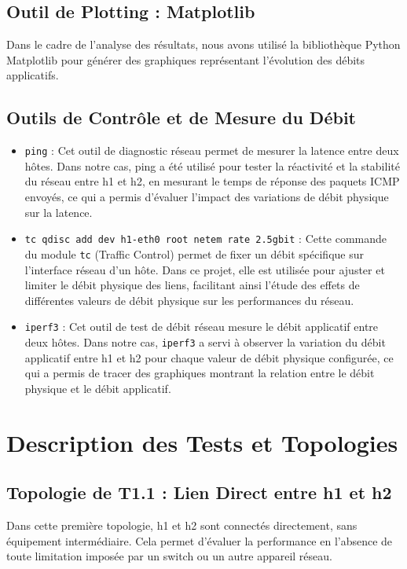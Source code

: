 \subsection{Outil de Plotting : Matplotlib}
Dans le cadre de l'analyse des résultats, nous avons utilisé la bibliothèque Python Matplotlib pour générer des graphiques représentant l'évolution des débits applicatifs.

\subsection{Outils de Contrôle et de Mesure du Débit}
\begin{itemize}
    \item \texttt{ping} : Cet outil de diagnostic réseau permet de mesurer la latence entre deux hôtes. Dans notre cas, ping a été utilisé pour tester la réactivité et la stabilité du réseau entre h1 et h2, en mesurant le temps de réponse des paquets ICMP envoyés, ce qui a permis d'évaluer l'impact des variations de débit physique sur la latence.
    
    \item \texttt{tc qdisc add dev h1-eth0 root netem rate 2.5gbit} : Cette commande du module \texttt{tc} (Traffic Control) permet de fixer un débit spécifique sur l’interface réseau d’un hôte. Dans ce projet, elle est utilisée pour ajuster et limiter le débit physique des liens, facilitant ainsi l’étude des effets de différentes valeurs de débit physique sur les performances du réseau.

    \item \texttt{iperf3} : Cet outil de test de débit réseau mesure le débit applicatif entre deux hôtes. Dans notre cas, \texttt{iperf3} a servi à observer la variation du débit applicatif entre h1 et h2 pour chaque valeur de débit physique configurée, ce qui a permis de tracer des graphiques montrant la relation entre le débit physique et le débit applicatif.

\end{itemize}

\section{Description des Tests et Topologies}

\subsection{Topologie de T1.1 : Lien Direct entre h1 et h2}
Dans cette première topologie, h1 et h2 sont connectés directement, sans équipement intermédiaire. Cela permet d’évaluer la performance en l’absence de toute limitation imposée par un switch ou un autre appareil réseau.

